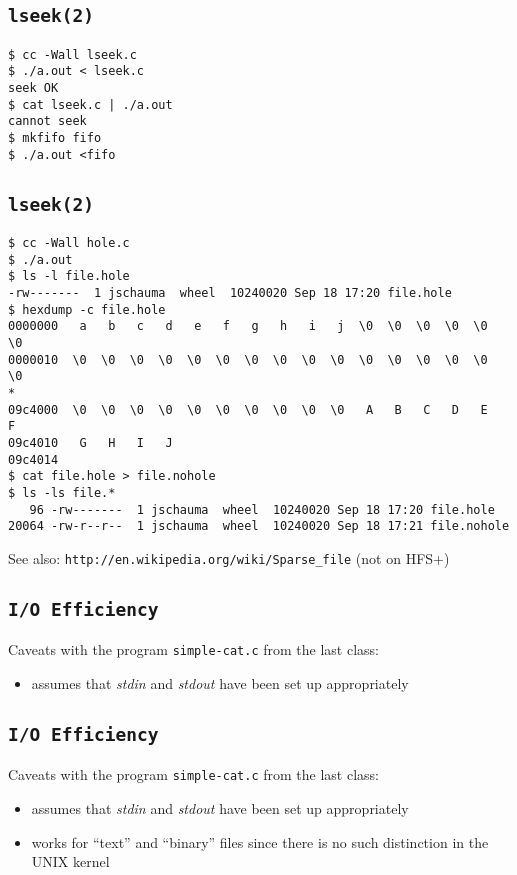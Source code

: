 \documentclass[xga]{xdvislides}
\begin{document}
\subsection{{\tt lseek(2)}}
\begin{verbatim}
$ cc -Wall lseek.c
$ ./a.out < lseek.c
seek OK
$ cat lseek.c | ./a.out
cannot seek
$ mkfifo fifo
$ ./a.out <fifo

\end{verbatim}



\subsection{{\tt lseek(2)}}
\begin{verbatim}
$ cc -Wall hole.c
$ ./a.out
$ ls -l file.hole
-rw-------  1 jschauma  wheel  10240020 Sep 18 17:20 file.hole
$ hexdump -c file.hole
0000000   a   b   c   d   e   f   g   h   i   j  \0  \0  \0  \0  \0  \0
0000010  \0  \0  \0  \0  \0  \0  \0  \0  \0  \0  \0  \0  \0  \0  \0  \0
*
09c4000  \0  \0  \0  \0  \0  \0  \0  \0  \0  \0   A   B   C   D   E   F
09c4010   G   H   I   J
09c4014
$ cat file.hole > file.nohole
$ ls -ls file.*
   96 -rw-------  1 jschauma  wheel  10240020 Sep 18 17:20 file.hole
20064 -rw-r--r--  1 jschauma  wheel  10240020 Sep 18 17:21 file.nohole
\end{verbatim}

See also: \verb+http://en.wikipedia.org/wiki/Sparse_file+ (not on HFS+)


\subsection{{\tt I/O Efficiency}}
Caveats with the program {\tt simple-cat.c} from the last class:
\begin{itemize}
	\item assumes that {\em stdin} and {\em stdout} have been set up
		appropriately
\end{itemize}

\subsection{{\tt I/O Efficiency}}
Caveats with the program {\tt simple-cat.c} from the last class:
\begin{itemize}
	\item assumes that {\em stdin} and {\em stdout} have been set up
		appropriately
	\item works for ``text'' and ``binary'' files since there is no such
		distinction in the UNIX kernel
\end{itemize}
\end{document}
